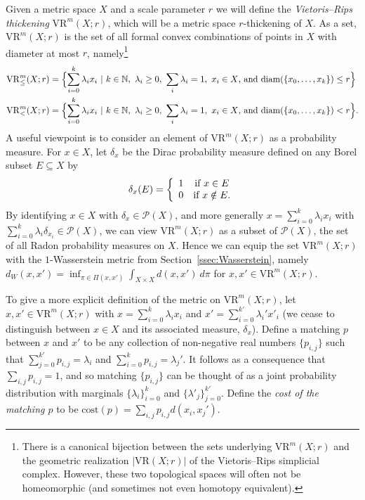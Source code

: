 \documentclass{amsart}
\theoremstyle{plain}
\theoremstyle{definition}
\theoremstyle{myremark}
\newcommand{\N}{\mathbb{N}}
\newcommand{\diam}{\mathrm{diam}}
\newcommand{\cost}{\mathrm{cost}}
\newcommand{\cP}{\mathcal{P}}
\newcommand{\vr}[2]{\mathrm{VR}(#1;#2)}
\newcommand{\vrm}[2]{\mathrm{VR}^m(#1;#2)}
\newcommand{\vrmleq}[2]{\mathrm{VR}^m_\leq(#1;#2)}
\newcommand{\vrmless}[2]{\mathrm{VR}^m_<(#1;#2)}
\begin{document}
Given a metric space $X$ and a scale parameter $r$ we will define the \emph{Vietoris--Rips thickening} $\vrm{X}{r}$, which will be a metric space $r$-thickening of $X$. As a set, $\vrm{X}{r}$ is the set of all formal convex combinations of points in $X$ with diameter at most $r$, namely\footnote{There is a canonical bijection between the sets underlying $\vrm{X}{r}$ and the geometric realization $|\vr{X}{r}|$ of the Vietoris--Rips simplicial complex. However, these two topological spaces will often not be homeomorphic (and sometimes not even homotopy equivalent).}
\begin{align*}
\vrmleq{X}{r}&=\Bigl\{ \sum_{i = 0}^k \lambda_i x_i~|~k\in\N,\ \lambda_i\ge 0,\ \sum_i\lambda_i=1,\ x_i\in X\mbox{, and }\diam(\{x_0,\ldots,x_k\}) \le r \Bigr\}\\
\vrmless{X}{r}&=\Bigl\{ \sum_{i = 0}^k \lambda_i x_i~|~k\in\N,\ \lambda_i\ge 0,\ \sum_i\lambda_i=1,\ x_i\in X\mbox{, and }\diam(\{x_0,\ldots,x_k\}) < r \Bigr\}.
\end{align*}
A useful viewpoint is to consider an element of $\vrm{X}{r}$ as a probability measure.
For $x\in X$, let $\delta_x$ be the Dirac probability measure defined on any Borel subset $E \subseteq X$ by
\[
   \delta_x(E) = \left\{\begin{array}{l c} 1 & \mbox{if }x \in E \\
   0 & \mbox{if }x \notin E.
   \end{array}\right.
\]
By identifying $x \in X$ with $\delta_x\in\cP(X)$, and more generally $x=\sum_{i = 0}^k \lambda_i x_i$ with $ \sum_{i = 0}^k \lambda_i \delta_{x_i}\in\cP(X)$, we can view $\vrm{X}{r}$ as a subset of $\cP(X)$, the set of all Radon probability measures on $X$.
Hence we can equip the set $\vrm{X}{r}$ with the $1$-Wasserstein metric from Section~\ref{ssec:Wasserstein}, namely $d_W(x,x') = \inf_{\pi \in \Pi(x,x')} \int_{X \times X} d(x,x')\ d\pi$ for $x,x'\in\vrm{X}{r}$.

To give a more explicit definition of the metric on $\vrm{X}{r}$, let $x,x' \in \vrm{X}{r}$ with $x = \sum_{i = 0}^k \lambda_i x_i$ and $x' = \sum_{i = 0}^{k'} \lambda_i' x'_i$ (we cease to distinguish between $x \in X$ and its associated measure, $\delta_x$).
Define a matching $p$ between $x$ and $x'$ to be any collection of non-negative real numbers $\{p_{i,j}\}$ such that $\sum_{j = 0}^{k'} p_{i,j} = \lambda_i $ and $\sum_{i = 0}^k p_{i,j} = \lambda_j'$. It follows as a consequence that $\sum_{i,j}p_{i,j}=1$, and so matching $\{p_{i,j}\}$ can be thought of as a joint probability distribution with marginals $\{\lambda_i\}_{i=0}^k$ and $\{\lambda'_j\}_{j=0}^{k'}$. 
Define the \emph{cost of the matching $p$} to be $\cost(p) = \sum_{i,j} p_{i,j} d(x_i,x_j')$.
\end{document}
